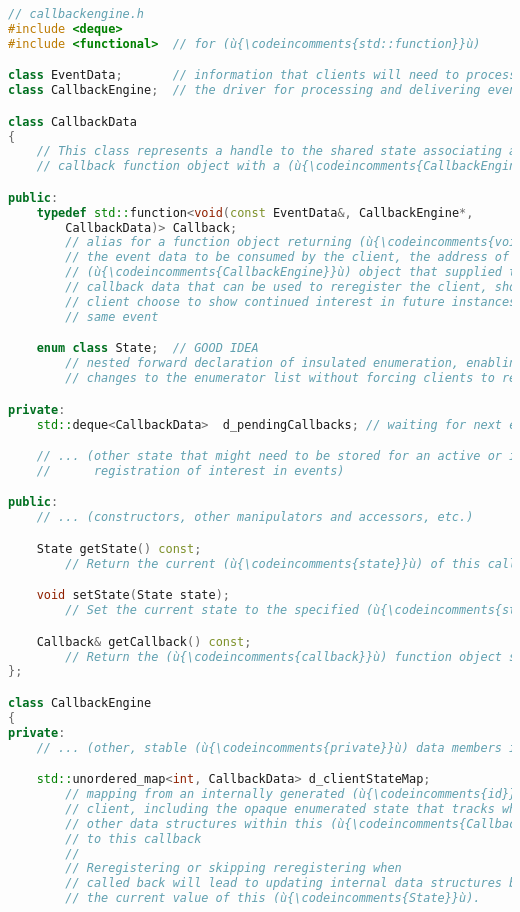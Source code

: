 \begin{lstlisting}[language=C++]
// callbackengine.h
#include <deque>
#include <functional>  // for (ù{\codeincomments{std::function}}ù)

class EventData;       // information that clients will need to process an event
class CallbackEngine;  // the driver for processing and delivering events

class CallbackData
{
    // This class represents a handle to the shared state associating a
    // callback function object with a (ù{\codeincomments{CallbackEngine}}ù).

public:
    typedef std::function<void(const EventData&, CallbackEngine*,
        CallbackData)> Callback;
        // alias for a function object returning (ù{\codeincomments{void}}ù) and taking, as arguments,
        // the event data to be consumed by the client, the address of the
        // (ù{\codeincomments{CallbackEngine}}ù) object that supplied the event data, and the
        // callback data that can be used to reregister the client, should the
        // client choose to show continued interest in future instances of the
        // same event

    enum class State;  // GOOD IDEA
        // nested forward declaration of insulated enumeration, enabling
        // changes to the enumerator list without forcing clients to recompile

private:
    std::deque<CallbackData>  d_pendingCallbacks; // waiting for next event

    // ... (other state that might need to be stored for an active or inactive
    //      registration of interest in events)

public:
    // ... (constructors, other manipulators and accessors, etc.)

    State getState() const;
        // Return the current (ù{\codeincomments{state}}ù) of this callback.

    void setState(State state);
        // Set the current state to the specified (ù{\codeincomments{state}}ù).

    Callback& getCallback() const;
        // Return the (ù{\codeincomments{callback}}ù) function object specified at construction.
};

class CallbackEngine
{
private:
    // ... (other, stable (ù{\codeincomments{private}}ù) data members implementing this object)

    std::unordered_map<int, CallbackData> d_clientStateMap;
        // mapping from an internally generated (ù{\codeincomments{id}}ù) to the full state for a
        // client, including the opaque enumerated state that tracks which
        // other data structures within this (ù{\codeincomments{CallbackEngine}}ù) have references
        // to this callback
        //
        // Reregistering or skipping reregistering when
        // called back will lead to updating internal data structures based on
        // the current value of this (ù{\codeincomments{State}}ù).


\end{lstlisting}
